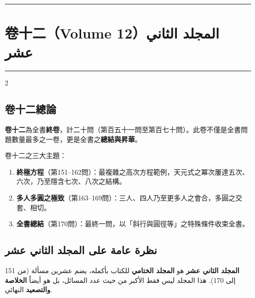 \documentclass[11pt,a4paper]{article}
\newcommand{\ar}[1]{\arabicfont\beginR #1\endR}
\newcommand{\longline}{\noindent\rule{\textwidth}{0.4pt}}
\newcommand{\arnote}[1]{\textcolor{arabicblue}{\ar{#1}}}
\begin{document}
\vspace{0.3cm}
\longline

\newpage

\section{卷十二（Volume 12）\hfill \ar{المجلد الثاني عشر}}
\label{sec:vol12}

\begin{center}
\longline
\end{center}

\begin{paracol}{2}

\begin{leftcolumn*}
\subsection*{卷十二總論}

\begin{framed}
\noindent\textbf{卷十二}為全書\textbf{終卷}，計二十問（第百五十一問至第百七十問）。此卷不僅是全書問題數量最多之一卷，更是全書之\textbf{總結與昇華}。
\end{framed}

卷十二之三大主題：

\begin{enumerate}[leftmargin=1.5em,topsep=0pt]
  \item \textbf{終極方程}（第151--162問）：最複雜之高次方程範例，天元式之冪次屢達五次、六次，乃至隱含七次、八次之結構。
  \item \textbf{多人多圓之極致}（第163--169問）：三人、四人乃至更多人之會合，多圓之交套、相切。
  \item \textbf{全書總結}（第170問）：最終一問，以「斜行與圓徑等」之特殊條件收束全書。
\end{enumerate}
\end{leftcolumn*}

\begin{rightcolumn}
\subsection*{\ar{نظرة عامة على المجلد الثاني عشر}}

\begin{framed}
\arnote{\textbf{المجلد الثاني عشر} هو \textbf{المجلد الختامي} للكتاب بأكمله، يضم عشرين مسألة (من 151 إلى 170). هذا المجلد ليس فقط الأكبر من حيث عدد المسائل، بل هو أيضاً \textbf{الخلاصة والتصعيد} النهائي.}
\end{framed}


\end{rightcolumn}
\end{paracol}
\end{document}
